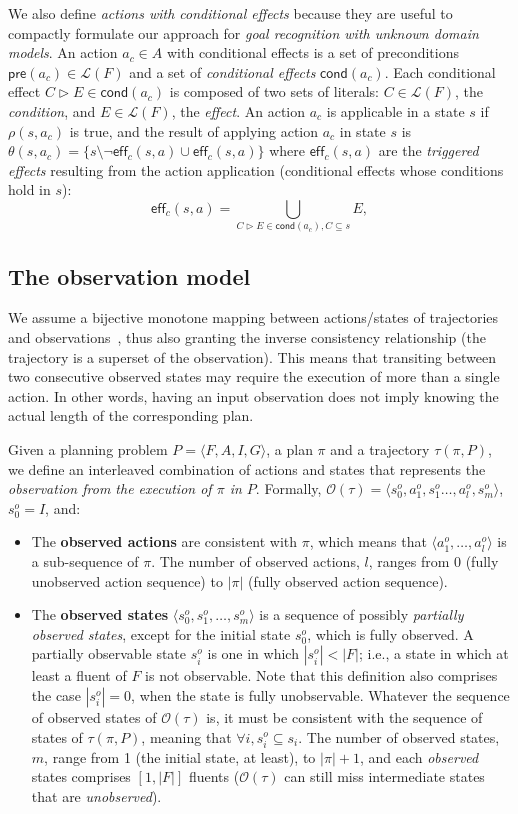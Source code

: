 \documentclass[letterpaper]{article} %
\newcommand{\tup}[1]{{\langle #1 \rangle}}
\newcommand{\pre}{\mathsf{pre}}     %
\newcommand{\eff}{\mathsf{eff}}     %
\newcommand{\cond}{\mathsf{cond}}   %
\begin{document}
We also define {\em actions with conditional effects} because they are useful to compactly formulate our approach for {\em goal recognition with unknown domain models}. An action $a_c\in A$ with conditional effects is a set of preconditions $\pre(a_c)\in\mathcal{L}(F)$ and a set of {\em conditional effects} $\cond(a_c)$. Each conditional effect $C\rhd E\in\cond(a_c)$ is composed of two sets of literals: $C\in\mathcal{L}(F)$, the {\em condition}, and $E\in\mathcal{L}(F)$, the {\em effect}. An action $a_c$ is applicable in a state $s$ if $\rho(s,a_c)$ is true, and the result of applying action $a_c$ in state $s$ is $\theta(s,a_c)=\{s\setminus\neg\eff_c(s,a)\cup\eff_c(s,a)\}$ where $\eff_c(s,a)$ are the {\em triggered effects} resulting from the action application (conditional effects whose conditions hold in $s$):
\[
\eff_c(s,a)=\bigcup_{C\rhd E\in\cond(a_c),C\subseteq s} E,
\]

\subsection{The observation model}
We assume a bijective monotone mapping between actions/states of trajectories and observations~\cite{ramirez2009plan}, thus also granting the inverse consistency relationship (the trajectory is a superset of the observation). This means that transiting between two consecutive observed states may require the execution of more than a single action. In other words, having an input observation does not imply knowing the actual length of the corresponding plan.

Given a planning problem $P=\tup{F,A,I,G}$, a plan $\pi$ and a trajectory $\tau(\pi,P)$, we define an interleaved combination of actions and states that represents the {\em observation from the execution of $\pi$ in $P$}. Formally, $\mathcal{O}(\tau)=\tup{s_0^o,a_1^o,s_1^o \ldots , a_l^o, s_m^o}$, $s_0^o=I$, and:
\begin{itemize}
\item The {\bf observed actions} are consistent with $\pi$, which means that $\tup{a_1^o, \ldots, a_l^o}$ is a sub-sequence of $\pi$. The number of observed actions, $l$, ranges from $0$ (fully unobserved action sequence) to $|\pi|$ (fully observed action sequence).
\item The {\bf observed states} $\tup{s_0^o, s_1^o, \ldots, s_m^o}$ is a sequence of possibly {\em partially observed states}, except for the initial state $s_0^o$, which is fully observed. A partially observable state $s_i^o$ is one in which $|s_i^o| < |F|$; i.e., a state in which at least a fluent of $F$ is not observable. Note that this definition also comprises the case $|s_i^o| = 0$, when the state is fully unobservable. Whatever the sequence of observed states of $\mathcal{O}(\tau)$ is, it must be consistent with the sequence of states of $\tau(\pi,P)$, meaning that $\forall i, s_i^o \subseteq s_i$. The number of observed states, $m$, range from 1 (the initial state, at least), to $|\pi|+1$, and each {\em observed} states comprises $[1,|F|]$ fluents ($\mathcal{O}(\tau)$ can still miss intermediate states that are {\em unobserved}).
\end{itemize}
\end{document}
